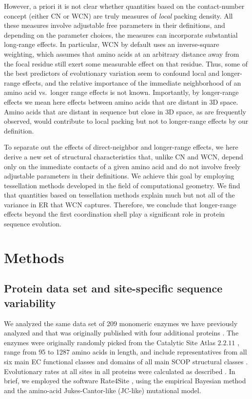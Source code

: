 \documentclass[12pt]{article}
\begin{document}
However, a priori it is not clear whether quantities based on the contact-number concept (either CN or WCN) are truly measures of \emph{local} packing density. All these measures involve adjustable free parameters in their definitions, and depending on the parameter choices, the measures can incorporate substantial long-range effects. In particular, WCN by default uses an inverse-square weighting, which assumes that amino acids at an arbitrary distance away from the focal residue still exert some measurable effect on that residue. Thus, some of the best predictors of evolutionary variation seem to confound local and longer-range effects, and the relative importance of the immediate neighborhood of an amino acid vs.\ longer range effects is not known. Importantly, by longer-range effects we mean here effects between amino acids that are distant in 3D space. Amino acids that are distant in sequence but close in 3D space, as are frequently observed\cite{plaxco_contact_1998,lai_sequence_2015}, would contribute to local packing but not to longer-range effects by our definition.


To separate out the effects of direct-neighbor and longer-range effects, we here derive a new set of structural characteristics that, unlike CN and WCN, depend only on the immediate contacts of a given amino acid and do not involve freely adjustable parameters in their definitions. We achieve this goal by employing tessellation methods developed in the field of computational geometry. We find that quantities based on tessellation methods explain much but not all of the variance in ER that WCN captures. Therefore, we conclude that longer-range effects beyond the first coordination shell play a significant role in protein sequence evolution.
    
\section*{Methods}
    
\subsection*{Protein data set and site-specific sequence variability}

We analyzed the same data set of 209 monomeric enzymes we have previously analyzed \cite{echave_relationship_2014} and that was originally published with four additional proteins \cite{yeh_site-specific_2014}. The enzymes were originally randomly picked from the Catalytic Site Atlas $2.2.11$ \cite{porter_catalytic_2004}, range from 95 to 1287 amino acids in length, and include representatives from all six main EC functional classes \cite{webb_enzyme_1992} and domains of all main SCOP structural classes \cite{murzin_scop:_1995}. Evolutionary rates at all sites in all proteins were calculated as described \cite{echave_relationship_2014}. In brief, we employed the software Rate4Site \cite{mayrose_comparison_2004}, using the empirical Bayesian method and the amino-acid Jukes-Cantor-like (JC-like) mutational model.
  
\end{document}
